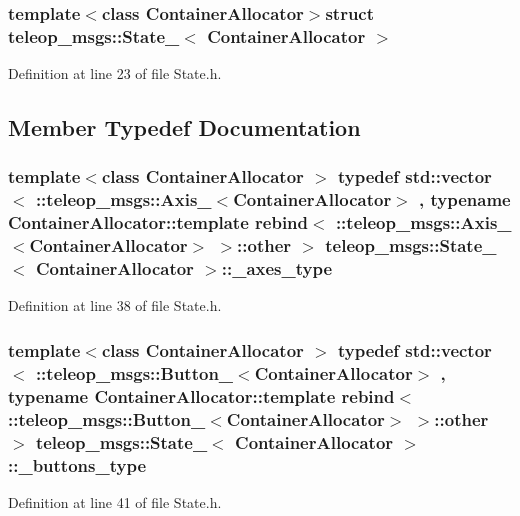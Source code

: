 \subsubsection*{template$<$class ContainerAllocator$>$struct teleop\_\-msgs::State\_\-$<$ ContainerAllocator $>$}



Definition at line 23 of file State.h.



\subsection{Member Typedef Documentation}
\subsubsection[{\_\-axes\_\-type}]{\setlength{\rightskip}{0pt plus 5cm}template$<$class ContainerAllocator $>$ typedef std::vector$<$ ::{\bf teleop\_\-msgs::Axis\_\-}$<$ContainerAllocator$>$ , typename ContainerAllocator::template rebind$<$ ::{\bf teleop\_\-msgs::Axis\_\-}$<$ContainerAllocator$>$ $>$::other $>$ {\bf teleop\_\-msgs::State\_\-}$<$ ContainerAllocator $>$::{\bf \_\-axes\_\-type}}\label{structteleop__msgs_1_1State___a556e44b8810d5290c9f40d360317c469}


Definition at line 38 of file State.h.

\subsubsection[{\_\-buttons\_\-type}]{\setlength{\rightskip}{0pt plus 5cm}template$<$class ContainerAllocator $>$ typedef std::vector$<$ ::{\bf teleop\_\-msgs::Button\_\-}$<$ContainerAllocator$>$ , typename ContainerAllocator::template rebind$<$ ::{\bf teleop\_\-msgs::Button\_\-}$<$ContainerAllocator$>$ $>$::other $>$ {\bf teleop\_\-msgs::State\_\-}$<$ ContainerAllocator $>$::{\bf \_\-buttons\_\-type}}\label{structteleop__msgs_1_1State___af3565a73e7e193e5d55b7d14e27c7c7a}


Definition at line 41 of file State.h.


